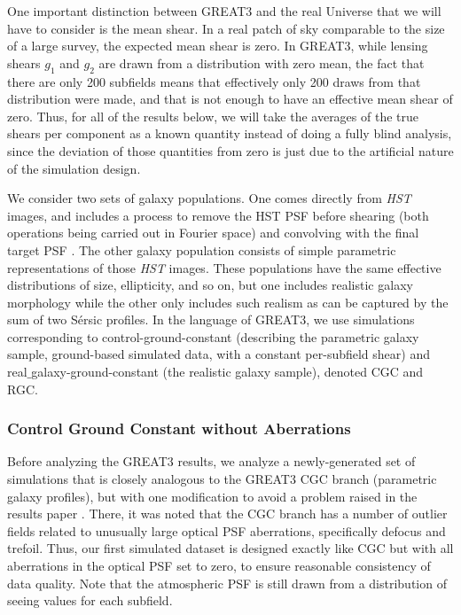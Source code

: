 \documentclass[iop]{emulateapj}
\begin{document}
One important distinction between GREAT3 and the real Universe that we
will have to consider is the mean shear.  In a real patch of sky
comparable to the size of a large survey, the expected mean shear is
zero.  In GREAT3, while lensing shears $g_1$ and $g_2$ are drawn from
a distribution with zero mean, the fact that there are only 200
subfields means that effectively only 200 draws from that distribution
were made, and that is not enough to have an effective mean shear of
zero.  Thus, for all of the results below, we will take the averages
of the true shears per component as a known quantity instead of doing
a fully blind analysis, since the deviation of those quantities from
zero is just due to the artificial nature of the simulation design.

We consider two sets of galaxy populations.  One comes directly from
{\it HST} images, and includes a process to remove the HST PSF before
shearing (both operations being carried out in Fourier space) and
convolving with the final target PSF \citep{2012MNRAS.420.1518M}.  The
other galaxy population consists of simple parametric representations
of those {\it HST} images.  These populations have the same effective
distributions of size, ellipticity, and so on, but one includes
realistic galaxy morphology while the other only includes such realism
as can be captured by the sum of two S\'{e}rsic profiles.  In the
language of GREAT3, we use simulations corresponding to
control-ground-constant (describing the parametric galaxy sample,
ground-based simulated data, with a constant per-subfield shear) and
real$\_$galaxy-ground-constant (the realistic galaxy sample), denoted
CGC and RGC.


\subsubsection{Control Ground Constant without Aberrations}

Before analyzing the GREAT3 results, we analyze a newly-generated set
of simulations that is closely analogous to the GREAT3 CGC branch
(parametric galaxy profiles), but with one modification to avoid a
problem raised in the results paper \citep{2015MNRAS.450.2963M}.
There, it was noted that the CGC branch has a number of outlier fields
related to unusually large optical PSF aberrations, specifically
defocus and trefoil.  Thus, our first simulated dataset is designed
exactly like CGC but with all aberrations in the optical PSF set to
zero, to ensure reasonable consistency of data quality.  Note that the
atmospheric PSF is still drawn from a distribution of seeing values
for each subfield.
\end{document}
